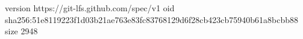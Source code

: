 version https://git-lfs.github.com/spec/v1
oid sha256:51e8119223f1d03b21ae763e83fc83768129d6f28cb423cb75940b61a8bcbb88
size 2948
